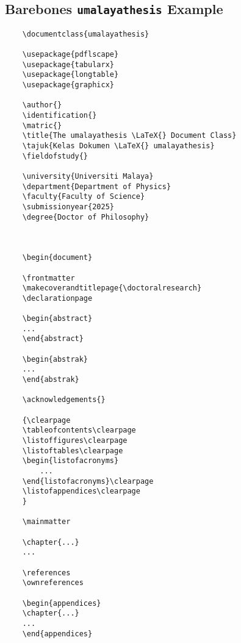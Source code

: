 \documentclass{umalayathesis}
\begin{document}
\begin{appendices}
\chapter{Barebones \texttt{umalayathesis} Example}

\begin{verbatim}
    \documentclass{umalayathesis}
    
    \usepackage{pdflscape}
    \usepackage{tabularx}
    \usepackage{longtable}
    \usepackage{graphicx}
    
    \author{}
    \identification{}
    \matric{}
    \title{The umalayathesis \LaTeX{} Document Class}
    \tajuk{Kelas Dokumen \LaTeX{} umalayathesis}
    \fieldofstudy{}
    
    \university{Universiti Malaya}
    \department{Department of Physics}
    \faculty{Faculty of Science}
    \submissionyear{2025}
    \degree{Doctor of Philosophy}
    
    
    
    \begin{document}
    
    \frontmatter
    \makecoverandtitlepage{\doctoralresearch}
    \declarationpage
    
    \begin{abstract}
    ...
    \end{abstract}
    
    \begin{abstrak}
    ...
    \end{abstrak}
    
    \acknowledgements{}
    
    {\clearpage
    \tableofcontents\clearpage
    \listoffigures\clearpage
    \listoftables\clearpage
    \begin{listofacronyms}
        ...
    \end{listofacronyms}\clearpage
    \listofappendices\clearpage
    }
    
    \mainmatter
    
    \chapter{...}
    ...
    
    \references
    \ownreferences
    
    \begin{appendices}
    \chapter{...}
    ...
    \end{appendices}
\end{verbatim}

\end{appendices}
\end{document}
